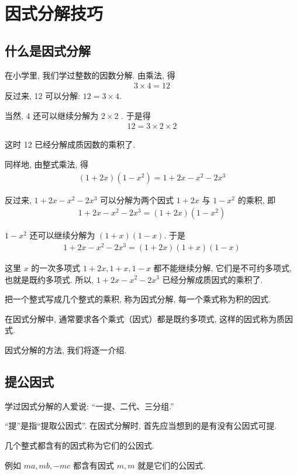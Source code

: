 \chapter{因式分解技巧}
\section*{什么是因式分解}
在小学里, 我们学过整数的因数分解. 由乘法, 得
\begin{align*}
	3 \times 4=12
\end{align*}
反过来, 12 可以分解: $12=3 \times 4$.

当然,  4 还可以继续分解为 $2 \times 2$ . 于是得
\begin{align*}
	12=3 \times 2 \times 2
\end{align*}

这时 12 已经分解成质因数的乘积了.

同样地, 由整式乘法, 得
\begin{align*}
	(1+2 x)\left(1-x^{2}\right)=1+2 x-x^{2}-2 x^{3}
\end{align*}

反过来,  $1+2 x-x^{2}-2 x^{3}$ 可以分解为两个因式 $1+2 x$ 与 $1-x^{2}$ 的乘积, 即
\begin{align*}
	1+2 x-x^{2}-2 x^{3}=(1+2 x)\left(1-x^{2}\right)
\end{align*}

$1-x^{2}$ 还可以继续分解为 $(1+x)(1-x)$. 于是
\begin{align*}
	1+2 x-x^{2}-2 x^{3}=(1+2 x)(1+x)(1-x)
\end{align*}

这里 $x$ 的一次多项式 $1+2 x ,  1+x ,  1-x$ 都不能继续分解, 它们是不可约多项式, 也就是既约多项式.  所以,  $1+2 x-x^{2}-2 x^{3}$ 已经分解成质因式的乘积了.

把一个整式写成几个整式的乘积, 称为因式分解, 每一个乘式称为积的因式.

在因式分解中, 通常要求各个乘式（因式）都是既约多项式, 这样的因式称为质因式.

因式分解的方法, 我们将逐一介绍.

\section{提公因式}
学过因式分解的人爱说: “一提、二代、三分组.”

“提”是指“提取公因式”. 在因式分解时, 首先应当想到的是有没有公因式可提.

几个整式都含有的因式称为它们的公因式.

例如 $m a ,  m b , -m c$ 都含有因式 $m, m$ 就是它们的公因式.

